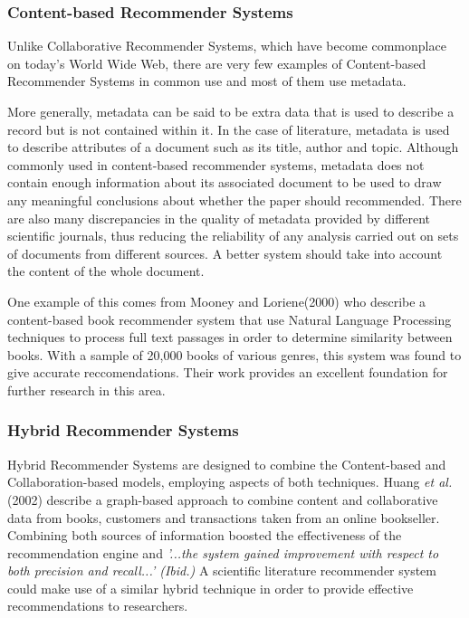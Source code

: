 \subsubsection{ Content-based Recommender Systems}

Unlike Collaborative Recommender Systems, which have become commonplace on
today's World Wide Web, there are very few examples of Content-based
Recommender Systems in common use and most of them use metadata. 

More generally, metadata can be said to be extra data that is used to describe
a record but is not contained within it. In the case of literature, metadata is
used to describe attributes of a document such as its title, author and topic.
Although commonly used in content-based recommender systems, metadata does not
contain enough information about its associated document to be used to draw any
meaningful conclusions about whether the paper should recommended. There are
also many discrepancies in the quality of metadata provided by different
scientific journals, thus reducing the reliability of any analysis carried out
on sets of documents from different sources\cite{palepumeta}. A better system
should take into account the content of the whole document.

One example of this comes from Mooney and Loriene(2000) who describe a
content-based book recommender system that use Natural Language Processing
techniques to process full text passages in order to determine similarity
between books\cite{Mooney:2000:CBR:336597.336662}. With a sample of 20,000
books of various genres, this system was found to give accurate
reccomendations. Their work provides an excellent foundation for further
research in this area.

\subsubsection{ Hybrid Recommender Systems }

Hybrid Recommender Systems are designed to combine the Content-based and
Collaboration-based models, employing aspects of both techniques. Huang
\emph{et al.}(2002) describe a graph-based approach to combine content and
collaborative data from books, customers and transactions taken from an online
bookseller\cite{Huang:2002:GRS:544220.544231}. Combining both sources of
information boosted the effectiveness of the recommendation engine and
\emph{'...the system gained improvement with respect to both precision and
recall...' (Ibid.)} A scientific literature recommender system could make use
of a similar hybrid technique in order to provide effective recommendations to
researchers.


